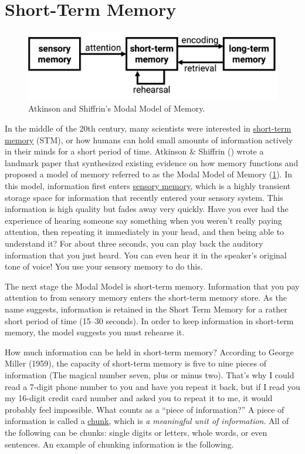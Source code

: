 \documentclass[
]{krantz}
\begin{document}
\section{Short-Term Memory}\label{short-term-memory}

\begin{figure}

{\centering \includegraphics[width=0.6\linewidth]{images/ch4/fig1} 

}

\caption{Atkinson and Shiffrin’s Modal Model of Memory.}\label{fig:modalmodel}
\end{figure}

In the middle of the 20th century, many scientists were interested in \hyperref[short-term-memory]{short-term memory} (STM), or how humans can hold small amounts of information actively in their minds for a short period of time. Atkinson \& Shiffrin () wrote a landmark paper that synthesized existing evidence on how memory functions and proposed a model of memory referred to as the Modal Model of Memory (\ref{fig:modalmodel}). In this model, information first enters \hyperref[sensory-memory]{sensory memory}, which is a highly transient storage space for information that recently entered your sensory system. This information is high quality but fades away very quickly. Have you ever had the experience of hearing someone say something when you weren't really paying attention, then repeating it immediately in your head, and then being able to understand it? For about three seconds, you can play back the auditory information that you just heard. You can even hear it in the speaker's original tone of voice! You use your sensory memory to do this.

The next stage the Modal Model is short-term memory. Information that you pay attention to from sensory memory enters the short-term memory store. As the name suggests, information is retained in the Short Term Memory for a rather short period of time (15--30 seconds). In order to keep information in short-term memory, the model suggests you must rehearse it.

How much information can be held in short-term memory? According to George Miller (1959), the capacity of short-term memory is five to nine pieces of information (The magical number seven, plus or minus two). That's why I could read a 7-digit phone number to you and have you repeat it back, but if I read you my 16-digit credit card number and asked you to repeat it to me, it would probably feel impossible. What counts as a ``piece of information?'' A piece of information is called a \hyperref[chunk]{chunk}, which is \emph{a meaningful unit of information}. All of the following can be chunks: single digits or letters, whole words, or even sentences. An example of chunking information is the following.
\end{document}
